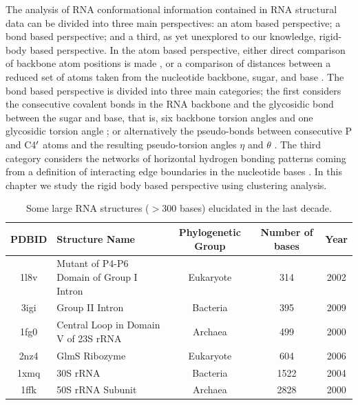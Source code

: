 \noindent The analysis of  RNA conformational information contained in
RNA structural  data can be  divided into three main  perspectives: an
atom based perspective; a bond  based perspective; and a third, as yet
unexplored  to our  knowledge, rigid-body  based perspective.   In the
atom  based perspective,  either  direct comparison  of backbone  atom
positions is  made \cite{reijmers2001},  or a comparison  of distances
between a  reduced set  of atoms taken  from the  nucleotide backbone,
sugar,  and  base \cite{sykes2005}.   The  bond  based perspective  is
divided  into   three  main   categories;  the  first   considers  the
consecutive covalent bonds in the RNA backbone and the glycosidic bond
between the sugar  and base, that is, six  backbone torsion angles and
one   glycosidic   torsion   angle   \cite{reijmers2001,   murray2003,
  hershkovitz2003,  schneider2004, hershkovitz2006};  or alternatively
the  pseudo-bonds between consecutive  P and  C4$^{\rm{\prime}}$ atoms
and   the  resulting   pseudo-torsion  angles   $\eta$   and  $\theta$
\cite{olson1_1972,  duarte1998,  duarte2003,  wadley2007}.  The  third
category  considers  the   networks  of  horizontal  hydrogen  bonding
patterns coming  from a definition  of interacting edge  boundaries in
the nucleotide bases  \cite{westhof2000, leontis2002, leontis2006}. In
this  chapter  we  study   the  rigid  body  based  perspective  using
clustering analysis.
\begin{table}[htbp]
\begin{center}
{\small
\begin{tabular}{c|p{5cm}|c|c|c}
\hline
\bf{PDBID} & \bf{Structure Name} & \bf{Phylogenetic Group} & \bf{Number of bases} & \bf{Year} \\ \hline
1l8v & Mutant of P4-P6 Domain of Group I Intron & Eukaryote & 314 & 2002 \\ \hline
3igi & Group II Intron & Bacteria & 395 & 2009 \\ \hline
1fg0 & Central Loop in Domain V of 23S rRNA & Archaea & 499 & 2000 \\ \hline
2nz4 & GlmS Ribozyme & Eukaryote & 604 & 2006 \\ \hline
1xmq & 30S rRNA & Bacteria & 1522 & 2004 \\ \hline
1ffk & 50S rRNA Subunit & Archaea & 2828 & 2000 \\ \hline
\end{tabular}
}
\caption{Some large RNA structures ($>$300 bases) elucidated in the last decade.}
\end{center}
\label{tab:rnarange}
\end{table}

